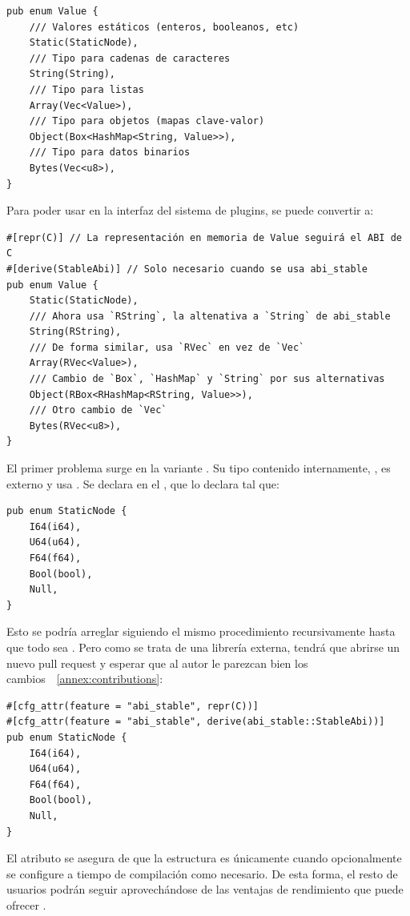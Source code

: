 \begin{verbatim}
pub enum Value {
    /// Valores estáticos (enteros, booleanos, etc)
    Static(StaticNode),
    /// Tipo para cadenas de caracteres
    String(String),
    /// Tipo para listas
    Array(Vec<Value>),
    /// Tipo para objetos (mapas clave-valor)
    Object(Box<HashMap<String, Value>>),
    /// Tipo para datos binarios
    Bytes(Vec<u8>),
}
\end{verbatim}

Para poder usar  en la interfaz del sistema de plugins, se puede
convertir a:

\begin{verbatim}
#[repr(C)] // La representación en memoria de Value seguirá el ABI de C
#[derive(StableAbi)] // Solo necesario cuando se usa abi_stable
pub enum Value {
    Static(StaticNode),
    /// Ahora usa `RString`, la altenativa a `String` de abi_stable
    String(RString),
    /// De forma similar, usa `RVec` en vez de `Vec`
    Array(RVec<Value>),
    /// Cambio de `Box`, `HashMap` y `String` por sus alternativas
    Object(RBox<RHashMap<RString, Value>>),
    /// Otro cambio de `Vec`
    Bytes(RVec<u8>),
}
\end{verbatim}

El primer problema surge en la variante . Su tipo contenido
internamente, , es externo y usa . Se
declara en el \crate {}, que lo declara tal que:

\begin{verbatim}
pub enum StaticNode {
    I64(i64),
    U64(u64),
    F64(f64),
    Bool(bool),
    Null,
}
\end{verbatim}

Esto se podría arreglar siguiendo el mismo procedimiento recursivamente hasta
que todo sea \code{#[repr(C)]}. Pero como se trata de una librería externa,
tendrá que abrirse un nuevo pull request y esperar que al autor le parezcan bien
los cambios~\cite{openstaticnode}~\ref{annex:contributions}:

\begin{verbatim}
#[cfg_attr(feature = "abi_stable", repr(C))]
#[cfg_attr(feature = "abi_stable", derive(abi_stable::StableAbi))]
pub enum StaticNode {
    I64(i64),
    U64(u64),
    F64(f64),
    Bool(bool),
    Null,
}
\end{verbatim}

El atributo  se asegura de que la estructura es \code{#[repr(C)]}
únicamente cuando opcionalmente se configure a tiempo de compilación como
necesario. De esta forma, el resto de usuarios podrán seguir aprovechándose de
las ventajas de rendimiento que puede ofrecer .


